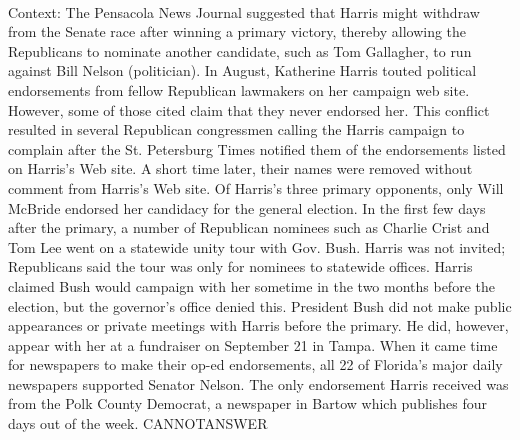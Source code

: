 \documentclass[11pt,a4paper, onecolumn]{article}
\begin{document}
\\ Context: The Pensacola News Journal suggested that Harris might withdraw from the Senate race after winning a primary victory, thereby allowing the Republicans to nominate another candidate, such as Tom Gallagher, to run against Bill Nelson (politician). In August, Katherine Harris touted political endorsements from fellow Republican lawmakers on her campaign web site. However, some of those cited claim that they never endorsed her. This conflict resulted in several Republican congressmen calling the Harris campaign to complain after the St. Petersburg Times notified them of the endorsements listed on Harris's Web site. A short time later, their names were removed without comment from Harris's Web site. Of Harris's three primary opponents, only Will McBride endorsed her candidacy for the general election. In the first few days after the primary, a number of Republican nominees such as Charlie Crist and Tom Lee went on a statewide unity tour with Gov. Bush. Harris was not invited; Republicans said the tour was only for nominees to statewide offices. Harris claimed Bush would campaign with her sometime in the two months before the election, but the governor's office denied this. President Bush did not make public appearances or private meetings with Harris before the primary. He did, however, appear with her at a fundraiser on September 21 in Tampa. When it came time for newspapers to make their op-ed endorsements, all 22 of Florida's major daily newspapers supported Senator Nelson. The only endorsement Harris received was from the Polk County Democrat, a newspaper in Bartow which publishes four days out of the week. CANNOTANSWER
\end{document}
